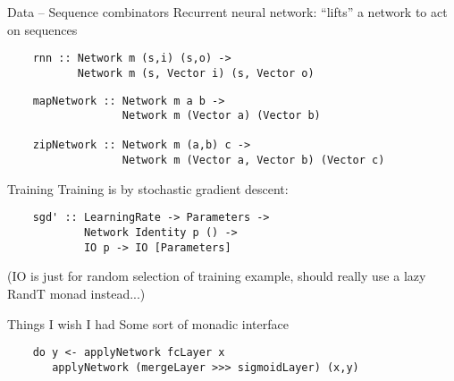 \documentclass[10pt]{beamer}
\newenvironment{xframe}[1][]{\begin{frame}[fragile,environment=xframe,#1]}{\end{frame}}
\begin{document}
\begin{xframe}{Data -- Sequence combinators}
  Recurrent neural network: ``lifts'' a network to act on sequences
  \begin{verbatim}
    rnn :: Network m (s,i) (s,o) ->
           Network m (s, Vector i) (s, Vector o)
  \end{verbatim}
  \pause
  \begin{verbatim}
    mapNetwork :: Network m a b ->
                  Network m (Vector a) (Vector b)

    zipNetwork :: Network m (a,b) c ->
                  Network m (Vector a, Vector b) (Vector c)
  \end{verbatim}
\end{xframe}

\begin{xframe}{Training}
  Training is by stochastic gradient descent:

  \begin{verbatim}
    sgd' :: LearningRate -> Parameters ->
            Network Identity p () ->
            IO p -> IO [Parameters]
  \end{verbatim}

  (IO is just for random selection of training example, should really use a lazy RandT monad instead...)
\end{xframe}

\begin{xframe}{Things I wish I had}
  Some sort of monadic interface
  \begin{verbatim}
    do y <- applyNetwork fcLayer x
       applyNetwork (mergeLayer >>> sigmoidLayer) (x,y)
  \end{verbatim}
\end{xframe}
\end{document}
